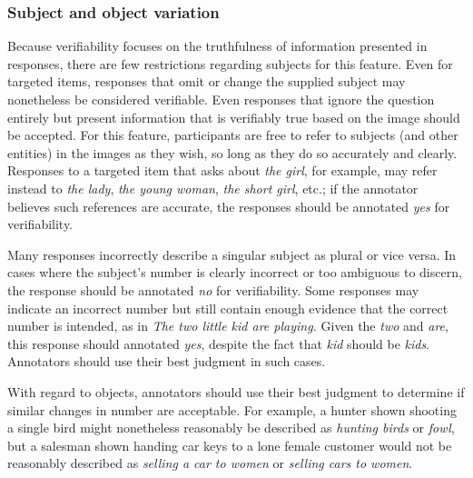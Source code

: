 \documentclass[12pt,notitlepage]{article}
\begin{document}
\subsubsection{Subject and object variation} Because verifiability focuses on the truthfulness of information presented in responses, there are few restrictions regarding subjects for this feature. Even for targeted items, responses that omit or change the supplied subject may nonetheless be considered verifiable. Even responses that ignore the question entirely but present information that is verifiably true based on the image should be accepted. For this feature, participants are free to refer to subjects (and other entities) in the images as they wish, so long as they do so accurately and clearly. Responses to a targeted item that asks about \textit{the girl}, for example, may refer instead to \textit{the lady}, \textit{the young woman}, \textit{the short girl}, etc.; if the annotator believes such references are accurate, the responses should be annotated \textit{yes} for verifiability.

Many responses incorrectly describe a singular subject as plural or vice versa. In cases where the subject's number is clearly incorrect or too ambiguous to discern, the response should be annotated \textit{no} for verifiability. Some responses may indicate an incorrect number but still contain enough evidence that the correct number is intended, as in \textit{The two little kid are playing.} Given the \textit{two} and \textit{are}, this response should annotated \textit{yes}, despite the fact that \textit{kid} should be \textit{kids}. Annotators should use their best judgment in such cases.

With regard to objects, annotators should use their best judgment to determine if similar changes in number are acceptable. For example, a hunter shown shooting a single bird might nonetheless reasonably be described as \textit{hunting birds} or \textit{fowl}, but a salesman shown handing car keys to a lone female customer would not be reasonably described as \textit{selling a car to women} or \textit{selling cars to women}.
\end{document}
